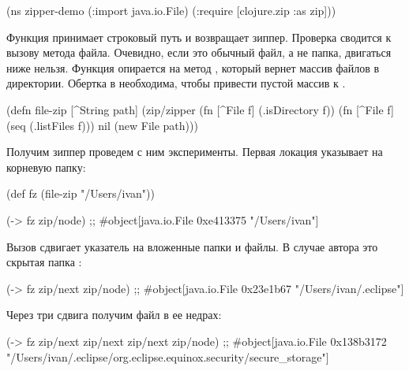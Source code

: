 \begin{english}
  \begin{clojure}
(ns zipper-demo
  (:import java.io.File)
  (:require
   [clojure.zip :as zip]))
  \end{clojure}
\end{english}

Функция  принимает строковый путь и возвращает зиппер. Проверка
 сводится к вызову метода  файла. Очевидно, если это
обычный файл, а не папка, двигаться ниже нельзя. Функция  опирается на
метод , который вернет массив файлов в директории. Обертка в 
необходима, чтобы привести пустой массив к .

\begin{english}
  \begin{clojure}
(defn file-zip [^String path]
  (zip/zipper
   (fn [^File f] (.isDirectory f))
   (fn [^File f] (seq (.listFiles f)))
   nil
   (new File path)))
  \end{clojure}
\end{english}

Получим зиппер проведем с ним эксперименты. Первая локация указывает на
корневую папку:

\begin{english}
  \begin{clojure}
(def fz
  (file-zip "/Users/ivan"))

(-> fz zip/node)
;; #object[java.io.File 0xe413375 "/Users/ivan"]
  \end{clojure}
\end{english}

Вызов  сдвигает указатель на вложенные папки и файлы. В случае автора
это скрытая папка :

\begin{english}
  \begin{clojure}
(-> fz zip/next zip/node)
;; #object[java.io.File 0x23e1b67 "/Users/ivan/.eclipse"]
  \end{clojure}
\end{english}

Через три сдвига получим файл  в ее недрах:

\begin{english}
  \begin{clojure}
(-> fz zip/next zip/next zip/next zip/node)
;; #object[java.io.File 0x138b3172 "/Users/ivan/.eclipse/org.eclipse.equinox.security/secure_storage"]
  \end{clojure}
\end{english}


